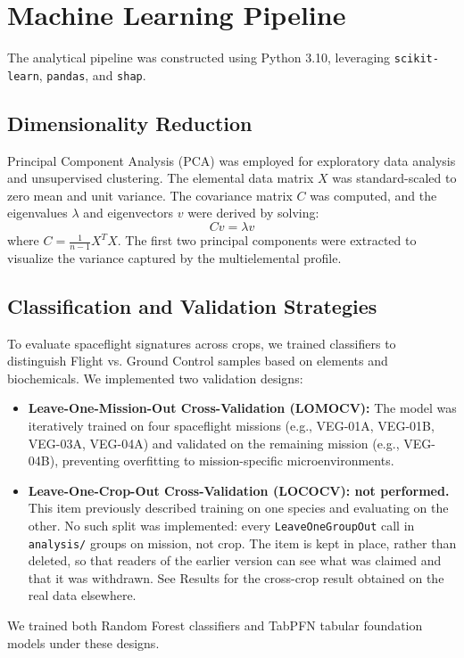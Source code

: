 \section{Machine Learning Pipeline}

The analytical pipeline was constructed using Python 3.10, leveraging \texttt{scikit-learn}, \texttt{pandas}, and \texttt{shap}. 

\subsection{Dimensionality Reduction}
Principal Component Analysis (PCA) was employed for exploratory data analysis and unsupervised clustering. The elemental data matrix $X$ was standard-scaled to zero mean and unit variance. The covariance matrix $C$ was computed, and the eigenvalues $\lambda$ and eigenvectors $v$ were derived by solving:
\begin{equation}
C v = \lambda v
\end{equation}
where $C = \frac{1}{n-1} X^T X$. The first two principal components were extracted to visualize the variance captured by the multielemental profile.

\subsection{Classification and Validation Strategies}
To evaluate spaceflight signatures across crops, we trained classifiers to distinguish Flight vs. Ground Control samples based on elements and biochemicals. We implemented two validation designs:
\begin{itemize}
    \item \textbf{Leave-One-Mission-Out Cross-Validation (LOMOCV):} The model was iteratively trained on four spaceflight missions (e.g., VEG-01A, VEG-01B, VEG-03A, VEG-04A) and validated on the remaining mission (e.g., VEG-04B), preventing overfitting to mission-specific microenvironments.
    \item \textbf{Leave-One-Crop-Out Cross-Validation (LOCOCV): not performed.}
          This item previously described training on one species and evaluating
          on the other. No such split was implemented: every
          \texttt{LeaveOneGroupOut} call in \texttt{analysis/} groups on mission,
          not crop. The item is kept in place, rather than deleted, so that
          readers of the earlier version can see what was claimed and that it
          was withdrawn. See Results for the cross-crop result obtained on the
          real data elsewhere.
\end{itemize}
We trained both Random Forest classifiers \cite{breiman2001} and TabPFN tabular foundation models \cite{hollmann2025} under these designs.


